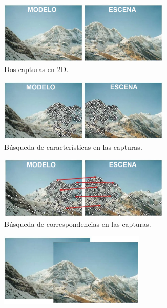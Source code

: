 \begin{figure}[h!]
    \centering
    \begin{subfigure}[t]{0.5\textheight}
        \centering
        \includegraphics[height=3cm]{archivos/ransac-ejemplo.png}
        \caption{Dos capturas en 2D.}
        \label{fig:ransac-ejemplo-capturas}
    \end{subfigure}
    \begin{subfigure}[t]{0.5\textheight}
        \centering
        \includegraphics[height=3cm]{archivos/ransac-ejemplo-caracteristicas.png}
        \caption{Búsqueda de características en las capturas.}
        \label{fig:ransac-ejemplo-caracteristicas}
    \end{subfigure}
    \begin{subfigure}[t]{0.5\textheight}
        \centering
        \includegraphics[height=3cm]{archivos/ransac-ejemplo-correspondencias.png}
        \caption{Búsqueda de correspondencias en las capturas.}
        \label{fig:ransac-ejemplo-correspondencias}
    \end{subfigure}
    \begin{subfigure}[t]{0.33\textheight}
        \centering
        \includegraphics[height=3.5cm]{archivos/ransac-ejemplo-alineado-bien.png}

\end{subfigure}
\end{figure}
